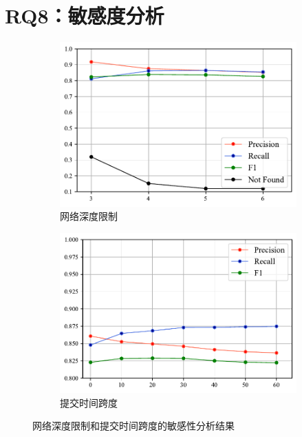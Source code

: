 \section{RQ8：敏感度分析}\label{sec:sensitivity}
\begin{figure}[h]
    \centering
    \begin{subfigure}[b]{0.45\textwidth}
    \centering
    \includegraphics[scale=0.55]{res/rq8-sensitivity-depth.pdf}
    \caption{网络深度限制}\label{fig:depth}
    \end{subfigure}
    \begin{subfigure}[b]{0.45\textwidth}
    \centering
    \includegraphics[scale=0.55]{res/rq8-sensitivity-span.pdf}
    \caption{提交时间跨度}\label{fig:span}
    \end{subfigure}
    \caption{网络深度限制和提交时间跨度的敏感性分析结果}\label{fig:sensitivity}
\end{figure}

